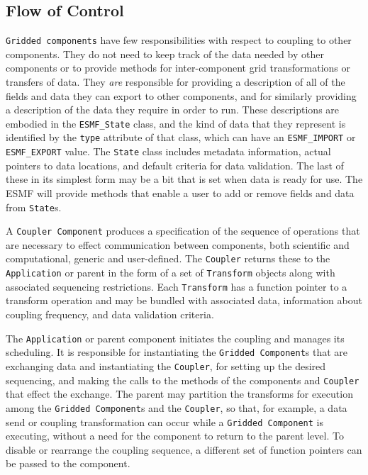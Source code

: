 \subsection{Flow of Control}
\label{sec:controlflow}
{\tt Gridded components} have few responsibilities with respect to coupling
to other components.  They do not need to keep track of the data needed
by other components or to provide methods for inter-component 
grid transformations or transfers of data.  They {\it are} responsible for 
providing a description of all of the fields and data they
can export to other components, and for similarly providing a description 
of the data they require in order to run.  These descriptions are
embodied in the {\tt ESMF\_State} class, and the kind of data that they 
represent is identified by the {\tt type} attribute of that class, which can
have an {\tt ESMF\_IMPORT} or {\tt ESMF\_EXPORT} value.  The {\tt State} class
includes metadata information, actual pointers to data 
locations, and default criteria for data validation.  The last of these in its
simplest form may be a bit that is set when data is ready for use.  The ESMF 
will provide methods that enable a user to add or remove fields and data from 
{\tt State}s.  

A {\tt Coupler Component} produces a specification of the sequence of 
operations that are necessary to effect communication between components, 
both scientific and computational, generic and user-defined.  The {\tt Coupler} 
returns these to the {\tt Application} or parent in the form of a set of {\tt Transform} objects 
along with associated sequencing restrictions.  Each {\tt Transform} has a
function pointer to a transform operation and may be bundled with 
associated data, information about coupling frequency, and 
data validation criteria.

The {\tt Application} or parent component initiates the coupling and manages 
its scheduling.  It is responsible for instantiating the {\tt Gridded Component}s
that are exchanging data and instantiating the {\tt Coupler}, for setting up the desired 
sequencing, and making the calls to the methods of the components and 
{\tt Coupler} that effect the exchange.  The parent may partition the 
transforms
for execution among the {\tt Gridded Component}s and the {\tt Coupler}, so that, for 
example, a data send or coupling transformation can occur while a {\tt Gridded 
Component} is executing, without a need for the component to return to the
parent level.  
To disable or rearrange the coupling sequence, a different set of function
pointers can be passed to the component.

